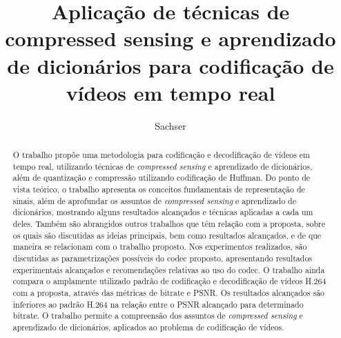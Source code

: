 \documentclass[cic,tc]{iiufrgs}
\title{Aplicação de técnicas de compressed sensing e aprendizado de dicionários para codificação de vídeos em tempo real}
\author{Sachser}{Eduardo}
\begin{document}
\maketitle





\begin{abstract}
    O trabalho propõe uma metodologia para codificação e decodificação de 
    vídeos em tempo real, utilizando técnicas de \emph{compressed sensing} e aprendizado 
    de dicionários, além de quantização e compressão utilizando codificação de Huffman.
    Do ponto de vista teórico, o trabalho apresenta os conceitos fundamentais de representação
    de sinais, além 
    de aprofundar os assuntos de \emph{compressed sensing} e aprendizado de dicionários,
    mostrando alguns resultados alcançados e técnicas aplicadas a cada um deles.
    Também são abrangidos outros trabalhos que têm relação com a proposta,
    sobre os quais são discutidas as ideias principais, bem como resultados alcançados, e de que 
    maneira se relacionam com o trabalho proposto.
    Nos experimentos realizados, são discutidas as parametrizações possíveis do 
    codec proposto, apresentando resultados experimentais alcançados e recomendações 
    relativas ao uso do codec.
    O trabalho ainda compara o amplamente utilizado padrão de codificação e decodificação 
    de vídeos H.264
    com a proposta, através das métricas de bitrate e PSNR.
    Os resultados alcançados são inferiores ao padrão H.264 na relação entre o PSNR alcançado
    para determinado bitrate.
    O trabalho permite a compreensão dos assuntos
    de \emph{compressed sensing} e aprendizado de dicionários,
    aplicados ao problema de codificação de vídeos.
\end{abstract}
\end{document}
